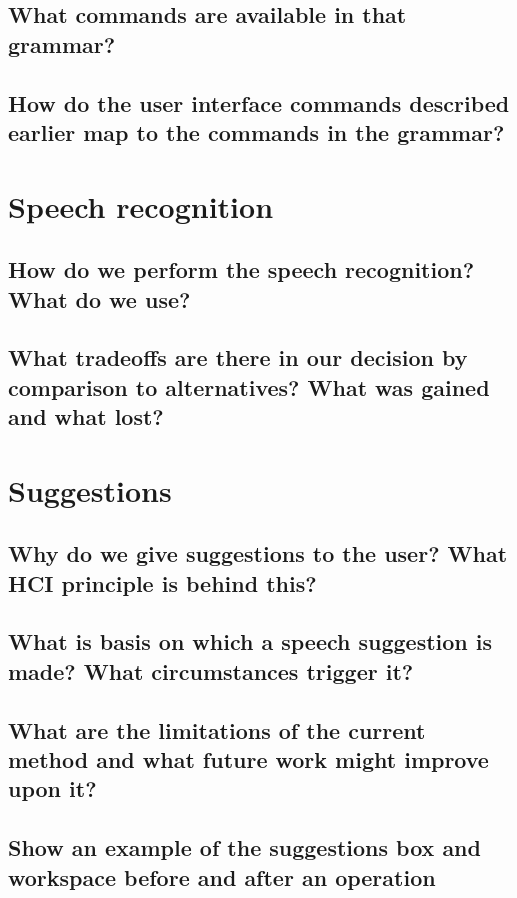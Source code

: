 \documentclass[]{article}
\begin{document}
\subsection{What commands are available in that grammar?}

\subsection{How do the user interface commands described earlier map to the commands in the grammar?  }


\section{Speech recognition}

\subsection{How do we perform the speech recognition? What do we use?}

\subsection{What tradeoffs are there in our decision by comparison to alternatives? What was gained and what lost?}


\section{Suggestions}

\subsection{Why do we give suggestions to the user? What HCI principle is behind this?}

\subsection{What is basis on which a speech suggestion is made? What circumstances trigger it?}

\subsection{What are the limitations of the current method and what future work might improve upon it?}

\subsection{Show an example of the suggestions box and workspace before and after an operation}
\end{document}
